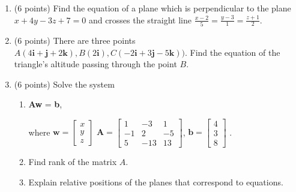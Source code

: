 \documentclass[]{exam}
\begin{document}
\begin{enumerate}

\item (6 points) 
Find the equation of a plane which is perpendicular to the plane  $x + 4y - 3z + 7 = 0$ and crosses the straight line $\frac{x-2}{5} = \frac{y-3}{1} = \frac{z+1}{2}$.





\item (6 points)  
There are three points $A(4\textbf{i} + \textbf{j} + 2\textbf{k}), B(2\textbf{i}), C(-2\textbf{i} + 3\textbf{j} - 5\textbf{k}))$. Find the equation of the triangle's altitude passing through the point $B$.





\item (6 points) Solve the system 
\begin{enumerate}
    \item \textbf{Aw} = \textbf{b}, 
    
    where 
    $\textbf{w} =\begin{bmatrix}
    x \\ y \\ z
    \end{bmatrix}$
    $
\textbf{A}=\begin{bmatrix}
1 & -3 & 1 \\
-1 & 2 & -5 \\
5 & -13 & 13
\end{bmatrix}$, 
$
\textbf{b}=
\begin{bmatrix}
4 \\
3 \\
8
\end{bmatrix}$
.
\begin{enumerate}
 
\end{enumerate}
\item Find rank of the matrix $A$.
\item Explain relative positions of the planes that correspond to equations.
\end{enumerate} 


\end{enumerate}
\end{document}
